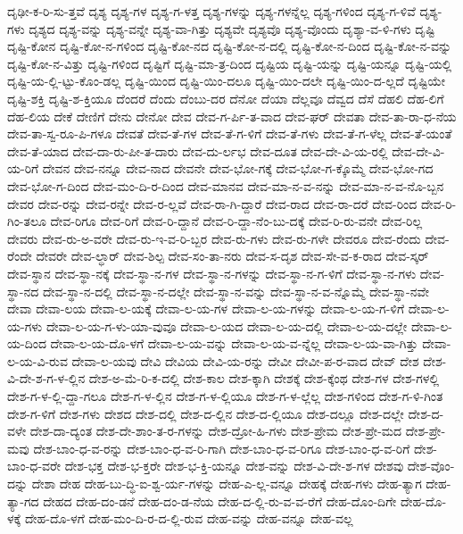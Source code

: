 {ದೃಢೀ-ಕ-ರಿ-ಸು-ತ್ತವೆ
ದೃಶ್ಯ
ದೃಶ್ಯ-ಗಳ
ದೃಶ್ಯ-ಗ-ಳತ್ತ
ದೃಶ್ಯ-ಗಳನ್ನು
ದೃಶ್ಯ-ಗಳನ್ನೆಲ್ಲ
ದೃಶ್ಯ-ಗಳಿಂದ
ದೃಶ್ಯ-ಗ-ಳಿವೆ
ದೃಶ್ಯ-ಗಳು
ದೃಶ್ಯದ
ದೃಶ್ಯ-ವನ್ನು
ದೃಶ್ಯ-ವನ್ನೇ
ದೃಶ್ಯ-ವಾ-ಗಿತ್ತು
ದೃಶ್ಯವೇ
ದೃಶ್ಯವೊ
ದೃಶ್ಯ-ವೊಂದು
ದೃಶ್ಯಾ-ವ-ಳಿ-ಗಳು
ದೃಷ್ಟಿ
ದೃಷ್ಟಿ-ಕೋನ
ದೃಷ್ಟಿ-ಕೋ-ನ-ಗಳಿಂದ
ದೃಷ್ಟಿ-ಕೋ-ನದ
ದೃಷ್ಟಿ-ಕೋ-ನ-ದಲ್ಲಿ
ದೃಷ್ಟಿ-ಕೋ-ನ-ದಿಂದ
ದೃಷ್ಟಿ-ಕೋ-ನ-ವನ್ನು
ದೃಷ್ಟಿ-ಕೋ-ನ-ವಿತ್ತು
ದೃಷ್ಟಿ-ಗಳಿಂದ
ದೃಷ್ಟಿಗೆ
ದೃಷ್ಟಿ-ಮಾ-ತ್ರ-ದಿಂದ
ದೃಷ್ಟಿಯ
ದೃಷ್ಟಿ-ಯನ್ನು
ದೃಷ್ಟಿ-ಯನ್ನೂ
ದೃಷ್ಟಿ-ಯಲ್ಲಿ
ದೃಷ್ಟಿ-ಯ-ಲ್ಲಿ-ಟ್ಟು-ಕೊಂ-ಡಲ್ಲ
ದೃಷ್ಟಿ-ಯಿಂದ
ದೃಷ್ಟಿ-ಯಿಂ-ದಲೂ
ದೃಷ್ಟಿ-ಯಿಂ-ದಲೇ
ದೃಷ್ಟಿ-ಯಿಂ-ದ-ಲ್ಲದೆ
ದೃಷ್ಟಿಯೇ
ದೃಷ್ಟಿ-ಶಕ್ತಿ
ದೃಷ್ಟಿ-ಶ-ಕ್ತಿಯೂ
ದೆಂದರೆ
ದೆಂದು
ದೆಂಬು-ದರ
ದೆನೋ
ದೆಯಾ
ದೆಲ್ಲವೂ
ದೆವ್ವದ
ದೆಸೆ
ದೆಹಲಿ
ದೆಹ-ಲಿಗೆ
ದೆಹ-ಲಿಯ
ದೇಕೆ
ದೇಣಿಗೆ
ದೇನು
ದೇನೋ
ದೇವ
ದೇವ-ಗ-ರ್ಪಿ-ತ-ವಾದ
ದೇವ-ಘರ್
ದೇವತಾ
ದೇವ-ತಾ-ರಾ-ಧ-ನೆಯ
ದೇವ-ತಾ-ಸ್ವ-ರೂ-ಪಿ-ಗಳೂ
ದೇವತೆ
ದೇವ-ತೆ-ಗಳ
ದೇವ-ತೆ-ಗ-ಳಿಗೆ
ದೇವ-ತೆ-ಗಳು
ದೇವ-ತೆ-ಗ-ಳೆಲ್ಲ
ದೇವ-ತೆ-ಯಂತೆ
ದೇವ-ತೆ-ಯಾದ
ದೇವ-ದಾ-ರು-ಪೀ-ತ-ದಾರು
ದೇವ-ದು-ರ್ಲಭ
ದೇವ-ದೂತ
ದೇವ-ದೇ-ವಿ-ಯ-ರಲ್ಲಿ
ದೇವ-ದೇ-ವಿ-ಯ-ರಿಗೆ
ದೇವನ
ದೇವ-ನನ್ನೂ
ದೇವ-ನಾದ
ದೇವನೇ
ದೇವ-ಭೋ-ಗಕ್ಕೆ
ದೇವ-ಭೋ-ಗ-ಕ್ಕೊಮ್ಮೆ
ದೇವ-ಭೋ-ಗದ
ದೇವ-ಭೋ-ಗ-ದಿಂದ
ದೇವ-ಮಂ-ದಿ-ರ-ದಿಂದ
ದೇವ-ಮಾನವ
ದೇವ-ಮಾ-ನ-ವ-ನನ್ನು
ದೇವ-ಮಾ-ನ-ವ-ನೊ-ಬ್ಬನ
ದೇವರ
ದೇವ-ರನ್ನು
ದೇವ-ರನ್ನೇ
ದೇವ-ರ-ಲ್ಲವೆ
ದೇವ-ರಾ-ಗಿ-ದ್ದಾರೆ
ದೇವ-ರಾದ
ದೇವ-ರಾ-ದರೆ
ದೇವ-ರಿಂದ
ದೇವ-ರಿ-ಗಿಂ-ತಲೂ
ದೇವ-ರಿಗೂ
ದೇವ-ರಿಗೆ
ದೇವ-ರಿ-ದ್ದಾನೆ
ದೇವ-ರಿ-ದ್ದಾ-ನೆಂ-ಬು-ದಕ್ಕೆ
ದೇವ-ರಿ-ರು-ವನೇ
ದೇವ-ರಿಲ್ಲ
ದೇವರು
ದೇವ-ರು-ಅ-ವರೇ
ದೇವ-ರು-ಇ-ವ-ರಿ-ಬ್ಬರ
ದೇವ-ರು-ಗಳು
ದೇವ-ರು-ಗಳೇ
ದೇವರೂ
ದೇವ-ರೆಂದು
ದೇವ-ರೆಂದೇ
ದೇವರೇ
ದೇವ-ಲ್ಧಾರ್
ದೇವ-ಶಿಲ್ಪ
ದೇವ-ಸಂ-ತಾ-ನರು
ದೇವ-ಸ-ದೃಶ
ದೇವ-ಸೇ-ವ-ಕ-ರಾದ
ದೇವ-ಸ್ಕರ್
ದೇವ-ಸ್ಥಾನ
ದೇವ-ಸ್ಥಾ-ನಕ್ಕೆ
ದೇವ-ಸ್ಥಾ-ನ-ಗಳ
ದೇವ-ಸ್ಥಾ-ನ-ಗಳನ್ನು
ದೇವ-ಸ್ಥಾ-ನ-ಗ-ಳಿಗೆ
ದೇವ-ಸ್ಥಾ-ನ-ಗಳು
ದೇವ-ಸ್ಥಾ-ನದ
ದೇವ-ಸ್ಥಾ-ನ-ದಲ್ಲಿ
ದೇವ-ಸ್ಥಾ-ನ-ದಲ್ಲೇ
ದೇವ-ಸ್ಥಾ-ನ-ವನ್ನು
ದೇವ-ಸ್ಥಾ-ನ-ವ-ನ್ನೊಮ್ಮೆ
ದೇವ-ಸ್ಥಾ-ನವೇ
ದೇವಾ
ದೇವಾ-ಲಯ
ದೇವಾ-ಲ-ಯಕ್ಕೆ
ದೇವಾ-ಲ-ಯ-ಗಳ
ದೇವಾ-ಲ-ಯ-ಗಳನ್ನು
ದೇವಾ-ಲ-ಯ-ಗ-ಳಿಗೆ
ದೇವಾ-ಲ-ಯ-ಗಳು
ದೇವಾ-ಲ-ಯ-ಗ-ಳು-ಯಾ-ವುವೂ
ದೇವಾ-ಲ-ಯದ
ದೇವಾ-ಲ-ಯ-ದಲ್ಲಿ
ದೇವಾ-ಲ-ಯ-ದಲ್ಲೇ
ದೇವಾ-ಲ-ಯ-ದಿಂದ
ದೇವಾ-ಲ-ಯ-ದೊ-ಳಗೆ
ದೇವಾ-ಲ-ಯ-ವನ್ನು
ದೇವಾ-ಲ-ಯ-ವ-ನ್ನೆಲ್ಲ
ದೇವಾ-ಲ-ಯ-ವಾ-ಗಿತ್ತು
ದೇವಾ-ಲ-ಯ-ವಿ-ರುವ
ದೇವಾ-ಲ-ಯವು
ದೇವಿ
ದೇವಿಯ
ದೇವಿ-ಯ-ರನ್ನು
ದೇವೀ
ದೇವೀ-ಪ-ರ-ವಾದ
ದೇವ್
ದೇಶ
ದೇಶ-ವಿ-ದೇ-ಶ-ಗ-ಳ-ಲ್ಲಿನ
ದೇಶ-ಅ-ಮೆ-ರಿ-ಕ-ದಲ್ಲಿ
ದೇಶ-ಕಾಲ
ದೇಶ-ಕ್ಕಾಗಿ
ದೇಶಕ್ಕೆ
ದೇಶ-ಕ್ಕೆಂಥ
ದೇಶ-ಗಳ
ದೇಶ-ಗಳಲ್ಲಿ
ದೇಶ-ಗ-ಳ-ಲ್ಲಿ-ದ್ದಾ-ಗಲೂ
ದೇಶ-ಗ-ಳ-ಲ್ಲಿನ
ದೇಶ-ಗ-ಳ-ಲ್ಲಿಯೂ
ದೇಶ-ಗ-ಳ-ಲ್ಲೆಲ್ಲ
ದೇಶ-ಗಳಿಂದ
ದೇಶ-ಗ-ಳಿ-ಗಿಂತ
ದೇಶ-ಗ-ಳಿಗೆ
ದೇಶ-ಗಳು
ದೇಶದ
ದೇಶ-ದಲ್ಲಿ
ದೇಶ-ದ-ಲ್ಲಿನ
ದೇಶ-ದ-ಲ್ಲಿಯೂ
ದೇಶ-ದಲ್ಲೂ
ದೇಶ-ದಲ್ಲೇ
ದೇಶ-ದ-ವಳೇ
ದೇಶ-ದಾ-ದ್ಯಂತ
ದೇಶ-ದೇ-ಶಾಂ-ತ-ರ-ಗಳನ್ನು
ದೇಶ-ದ್ರೋ-ಹಿ-ಗಳು
ದೇಶ-ಪ್ರೇಮ
ದೇಶ-ಪ್ರೇ-ಮದ
ದೇಶ-ಪ್ರೇ-ಮವು
ದೇಶ-ಬಾಂ-ಧ-ವ-ರನ್ನು
ದೇಶ-ಬಾಂ-ಧ-ವ-ರಿ-ಗಾಗಿ
ದೇಶ-ಬಾಂ-ಧ-ವ-ರಿಗೂ
ದೇಶ-ಬಾಂ-ಧ-ವ-ರಿಗೆ
ದೇಶ-ಬಾಂ-ಧ-ವರೇ
ದೇಶ-ಭಕ್ತ
ದೇಶ-ಭ-ಕ್ತರೇ
ದೇಶ-ಭ-ಕ್ತಿ-ಯನ್ನೂ
ದೇಶ-ವನ್ನು
ದೇಶ-ವಿ-ದೇ-ಶ-ಗಳ
ದೇಶವು
ದೇಶ-ವೊಂ-ದನ್ನು
ದೇಶಾ
ದೇಹ
ದೇಹ-ಬು-ದ್ಧಿ-ಐ-ಶ್ವ-ರ್ಯ-ಗಳನ್ನು
ದೇಹ-ಎ-ಲ್ಲ-ವನ್ನೂ
ದೇಹಕ್ಕೆ
ದೇಹ-ಗಳು
ದೇಹ-ತ್ಯಾಗ
ದೇಹ-ತ್ಯಾ-ಗದ
ದೇಹದ
ದೇಹ-ದಂ-ಡನೆ
ದೇಹ-ದಂ-ಡ-ನೆಯ
ದೇಹ-ದ-ಲ್ಲಿ-ರು-ವ-ವ-ರೆಗೆ
ದೇಹ-ದೊಂ-ದಿಗೇ
ದೇಹ-ದೊ-ಳಕ್ಕೆ
ದೇಹ-ದೊ-ಳಗೆ
ದೇಹ-ಮಂ-ದಿ-ರ-ದ-ಲ್ಲಿ-ರುವ
ದೇಹ-ವನ್ನು
ದೇಹ-ವನ್ನೂ
ದೇಹ-ವಲ್ಲ
}
